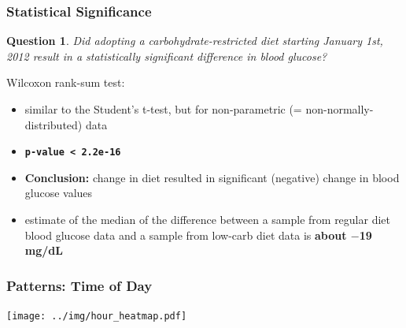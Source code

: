 \documentclass{beamer}
\newtheorem{question}{Question}
\begin{document}
\begin{frame}
  \frametitle{Statistical Significance}

  \begin{question}
     Did adopting a carbohydrate-restricted diet starting January 1st, 2012 result in a statistically significant difference in
     blood glucose?
  \end{question}
  Wilcoxon rank-sum test:
  \begin{itemize}
  \item similar to the Student's t-test, but for non-parametric (= non-normally-distributed) data
  \item \textbf{\texttt{p-value < 2.2e-16}}
  \item \textbf{Conclusion:} change in diet resulted in significant (negative) change in blood glucose values
  \item estimate of the median of the difference between a sample from regular diet blood glucose data and a sample from low-carb
    diet data is \textbf{about $-$19 mg/dL}
  \end{itemize}

\end{frame}

\begin{frame}
  \frametitle{Patterns: Time of Day}
  
  \begin{center}
    \texttt{[image: ../img/hour\_heatmap.pdf]}
  \end{center}
\end{frame}

\end{document}

